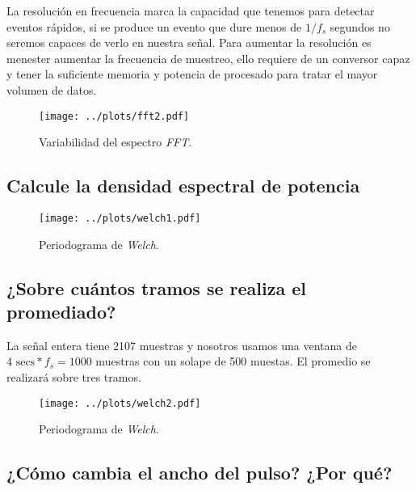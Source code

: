 \documentclass{article}
\begin{document}
La resolución en frecuencia marca la capacidad que tenemos para
detectar eventos rápidos, si se produce un evento que dure menos de
$1/f_{s}$ segundos no seremos capaces de verlo en nuestra señal. Para
aumentar la resolución es menester aumentar la frecuencia de muestreo,
ello requiere de un conversor capaz y tener la suficiente memoria y
potencia de procesado para tratar el mayor volumen de datos.
\vfill
\begin{figure}[h]
\centering
\texttt{[image: ../plots/fft2.pdf]}
\vspace{-1.5cm}
\caption{Variabilidad del espectro \textit{FFT}.}
\label{fig:LABEL_NAME}
\end{figure}
\vfill
\newpage

\subsection{Calcule la densidad espectral de potencia}

\begin{figure}[h]
\centering
\texttt{[image: ../plots/welch1.pdf]}
\vspace{-1cm}
\caption{Periodograma de \textit{Welch}.}
\label{fig:welch}
\end{figure}


\subsection{¿Sobre cuántos tramos se realiza el promediado?}

La señal entera tiene 2107 muestras y nosotros usamos una ventana de
$4 \text{ secs} * f_{s} = 1000$ muestras con un solape de 500 muestas.
El promedio se realizará sobre tres tramos.

\begin{figure}[h]
\centering
\texttt{[image: ../plots/welch2.pdf]}
\vspace{-1cm}
\caption{Periodograma de \textit{Welch}.}
\label{fig:welch}
\end{figure}

\subsection{¿Cómo cambia el ancho del pulso? ¿Por qué?}
\end{document}
